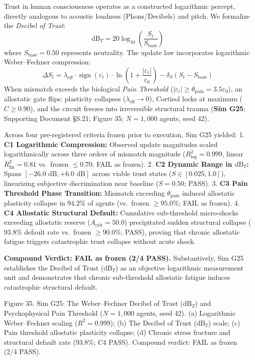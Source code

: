\documentclass[
]{article}
\begin{document}
Trust in human consciousness operates as a constructed logarithmic
percept, directly analogous to acoustic loudness (Phons/Decibels) and
pitch. We formalize the \emph{Decibel of Trust}: \[
\text{dB}_T = 20 \log_{10}\left(\frac{S_t}{S_{\text{base}}}\right)
\] where \(S_{\text{base}} = 0.50\) represents neutrality. The update
law incorporates logarithmic Weber--Fechner compression: \[
\Delta S_t = \lambda_{\text{eff}} \cdot \operatorname{sign}(\varepsilon_t) \cdot \ln\left(1 + \frac{|\varepsilon_t|}{\varepsilon_0}\right) - \delta_S (S_t - S_{\text{base}})
\] When mismatch exceeds the biological \emph{Pain Threshold}
(\(|\varepsilon_t| \ge \theta_{\text{pain}} = 3.5\varepsilon_0\)), an
allostatic gate flips: plasticity collapses
(\(\lambda_{\text{eff}} \to 0\)), Cortisol locks at maximum
(\(C \ge 0.90\)), and the circuit freezes into irreversible structural
trauma (\textbf{Sim G25}; Supporting Document §S.21; Figure 35;
\(N = 1,000\) agents, seed 42).

Across four pre-registered criteria frozen prior to execution, Sim G25
yielded: 1. \textbf{C1 Logarithmic Compression:} Observed update
magnitudes scaled logarithmically across three orders of mismatch
magnitude (\(R^2_{\text{log}} = 0.999\), linear
\(R^2_{\text{lin}} = 0.81\) vs.~frozen \(\le 0.70\); FAIL as frozen). 2.
\textbf{C2 Dynamic Range in \(\text{dB}_T\):} Spans
\([-26.0\text{ dB}, +6.0\text{ dB}]\) across viable trust states
(\(S \in [0.025, 1.0]\)), linearizing subjective discrimination near
baseline (\(S = 0.50\); PASS). 3. \textbf{C3 Pain Threshold Phase
Transition:} Mismatch exceeding \(\theta_{\text{pain}}\) induced
allostatic plasticity collapse in \(94.2\%\) of agents (vs.~frozen
\(\ge 95.0\%\); FAIL as frozen). 4. \textbf{C4 Allostatic Structural
Default:} Cumulative sub-threshold micro-shocks exceeding allostatic
reserve (\(A_{\text{crit}} = 50.0\)) precipitated sudden structural
collapse (\(93.8\%\) default rate vs.~frozen \(\ge 90.0\%\); PASS),
proving that chronic allostatic fatigue triggers catastrophic trust
collapse without acute shock.

\textbf{Compound Verdict: FAIL as frozen (2/4 PASS).} Substantively, Sim
G25 establishes the Decibel of Trust (\(\text{dB}_T\)) as an objective
logarithmic measurement unit and demonstrates that chronic sub-threshold
allostatic fatigue induces catastrophic structural default.

Figure 35. Sim G25: The Weber--Fechner Decibel of Trust
(\(\text{dB}_T\)) and Psychophysical Pain Threshold (\(N = 1,000\)
agents, seed 42). (a) Logarithmic Weber--Fechner scaling
(\(R^2 = 0.999\)); (b) The Decibel of Trust (\(\text{dB}_T\)) scale; (c)
Pain threshold allostatic plasticity collapse; (d) Chronic stress
fracture and structural default rate (93.8\%; C4 PASS). Compound
verdict: FAIL as frozen (2/4 PASS).
\end{document}
